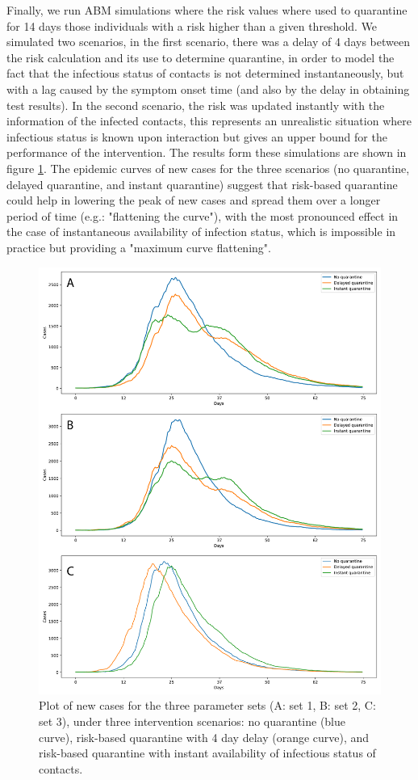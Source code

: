 \documentclass{article}
\begin{document}
Finally, we run ABM simulations where the risk values where used to quarantine for 14 days those individuals with a risk higher than a given threshold. We simulated two scenarios, in the first scenario, there was a delay of 4 days between the risk calculation and its use to determine quarantine, in order to model the fact that the infectious status of contacts is not determined instantaneously, but with a lag caused by the symptom onset time (and also by the delay in obtaining test results). In the second scenario, the risk was updated instantly with the information of the infected contacts, this represents an unrealistic situation where infectious status is known upon interaction but gives an upper bound for the performance of the intervention. The results form these simulations are shown in figure \ref{fig:fig5}. The epidemic curves of new cases for the three scenarios (no quarantine, delayed quarantine, and instant quarantine) suggest that risk-based quarantine could help in lowering the peak of new cases and spread them over a longer period of time (e.g.: "flattening the curve"), with the most pronounced effect in the case of instantaneous availability of infection status, which is impossible in practice but providing a "maximum curve flattening".

\begin{figure} %
  \centering
  \includegraphics[scale=0.4]{Figure-5.pdf}
  \caption{Plot of new cases for the three parameter sets (A: set 1, B: set 2, C: set 3), under three intervention scenarios: no quarantine (blue curve), risk-based quarantine with 4 day delay (orange curve), and risk-based quarantine with instant availability of infectious status of contacts.}
  \label{fig:fig5}
\end{figure}
\end{document}
